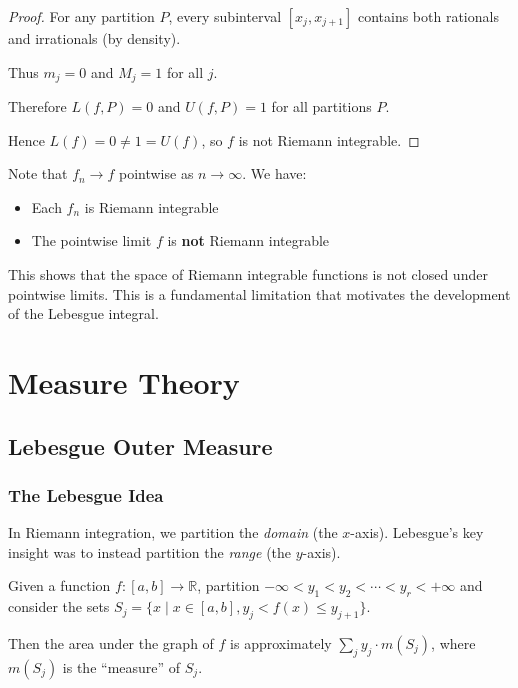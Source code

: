 \documentclass[11pt]{report}
\begin{document}
\begin{proof}
For any partition $P$, every subinterval $[x_j, x_{j+1}]$ contains both rationals and irrationals (by density).

Thus $m_j = 0$ and $M_j = 1$ for all $j$.

Therefore $L(f, P) = 0$ and $U(f, P) = 1$ for all partitions $P$.

Hence $L(f) = 0 \neq 1 = U(f)$, so $f$ is not Riemann integrable.
\end{proof}

\begin{rembox}
Note that $f_n \to f$ pointwise as $n \to \infty$. We have:
\begin{itemize}
    \item Each $f_n$ is Riemann integrable
    \item The pointwise limit $f$ is \textbf{not} Riemann integrable
\end{itemize}
This shows that the space of Riemann integrable functions is not closed under pointwise limits. This is a fundamental limitation that motivates the development of the Lebesgue integral.
\end{rembox}


\chapter{Measure Theory}

\section{Lebesgue Outer Measure}

\subsection{The Lebesgue Idea}

In Riemann integration, we partition the \textit{domain} (the $x$-axis). Lebesgue's key insight was to instead partition the \textit{range} (the $y$-axis).

Given a function $f: [a,b] \to \mathbb{R}$, partition $-\infty < y_1 < y_2 < \cdots < y_r < +\infty$ and consider the sets $S_j = \{x \mid x \in [a,b], y_j < f(x) \leq y_{j+1}\}$.

Then the area under the graph of $f$ is approximately $\sum_j y_j \cdot m(S_j)$, where $m(S_j)$ is the ``measure'' of $S_j$.
\end{document}
